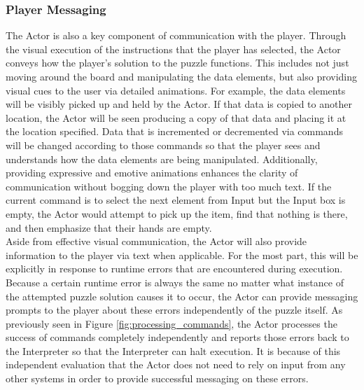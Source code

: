 \subsubsection{Player Messaging}
The Actor is also a key component of communication with the player. Through the visual 
execution of the instructions that the player has selected, the Actor conveys how the player's 
solution to the puzzle functions. This includes not just moving around the board and 
manipulating the data elements, but also providing visual cues to the user via detailed 
animations. For example, the data elements will be visibly picked up and held by the Actor. 
If that data is copied to another location, the Actor will be seen producing a copy of that 
data and placing it at the location specified. Data that is incremented or decremented via 
commands will be changed according to those commands so that the player sees and 
understands how the data elements are being manipulated. Additionally, providing expressive 
and emotive animations enhances the clarity of communication without bogging down the 
player with too much text. If the current command is to select the next element from Input 
but the Input box is empty, the Actor would attempt to pick up the item, find that nothing 
is there, and then emphasize that their hands are empty.\\

Aside from effective visual communication, the Actor will also provide information to the 
player via text when applicable. For the most part, this will be explicitly in response to 
runtime errors that are encountered during execution. Because a certain runtime error 
is always the same no matter what instance of the attempted puzzle solution causes it to 
occur, the Actor can provide messaging prompts to the player about these errors 
independently of the puzzle itself. As previously seen in Figure \ref{fig:processing_commands}, 
the Actor processes the success of commands completely independently and reports those 
errors back to the Interpreter so that the Interpreter can halt execution. It is because of this 
independent evaluation that the Actor does not need to rely on input from any other systems 
in order to provide successful messaging on these errors.\\

